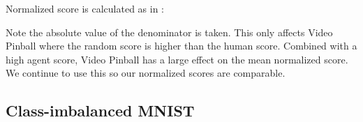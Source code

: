 \documentclass[a4paper]{article}
\begin{document}
\begin{table*}[!hpt]
\centering


\caption{
\label{tab-atari-evaluation-method}
Evaluation method comparison.
}
\end{table*}

\begin{table*}[!hpt]
\centering


\caption{
\label{tab-atari-epsilon}
The  used in the -greedy policy for each agent, for each evaluation method.
}
\end{table*}

Normalized score is calculated as in \citep{double-dqn}:


Note the absolute value of the denominator is taken.  This only affects Video Pinball where the random score is higher than the human score.  Combined with a high agent score, Video Pinball has a large effect on the mean normalized score.  We continue to use this so our normalized scores are comparable.

\subsection{Class-imbalanced MNIST}
\label{app-mnist-details}
\end{document}
